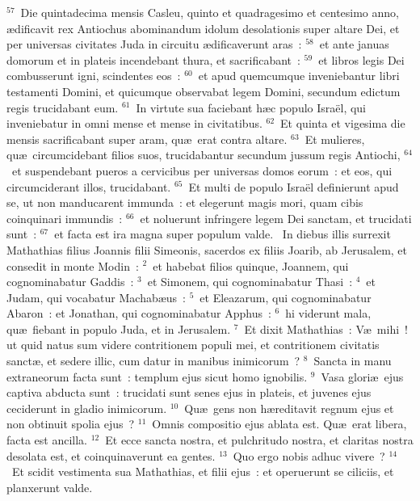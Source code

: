 ${}^{57}$~Die quintadecima mensis Casleu, quinto et quadragesimo et centesimo anno, \ae dificavit rex Antiochus abominandum idolum desolationis super altare Dei, et per universas civitates Juda in circuitu \ae dificaverunt aras~:
${}^{58}$~et ante januas domorum et in plateis incendebant thura, et sacrificabant~:
${}^{59}$~et libros legis Dei combusserunt igni, scindentes eos~:
${}^{60}$~et apud quemcumque inveniebantur libri testamenti Domini, et quicumque observabat legem Domini, secundum edictum regis trucidabant eum.
${}^{61}$~In virtute sua faciebant h\ae c populo Isra\"el, qui inveniebatur in omni mense et mense in civitatibus.
${}^{62}$~Et quinta et vigesima die mensis sacrificabant super aram, qu\ae\ erat contra altare.
${}^{63}$~Et mulieres, qu\ae\ circumcidebant filios suos, trucidabantur secundum jussum regis Antiochi,
${}^{64}$~et suspendebant pueros a cervicibus per universas domos eorum~: et eos, qui circumciderant illos, trucidabant.
${}^{65}$~Et multi de populo Isra\"el definierunt apud se, ut non manducarent immunda~: et elegerunt magis mori, quam cibis coinquinari immundis~:
${}^{66}$~et noluerunt infringere legem Dei sanctam, et trucidati sunt~:
${}^{67}$~et facta est ira magna super populum valde.
~In diebus illis surrexit Mathathias filius Joannis filii Simeonis, sacerdos ex filiis Joarib, ab Jerusalem, et consedit in monte Modin~:
${}^{2}$~et habebat filios quinque, Joannem, qui cognominabatur Gaddis~:
${}^{3}$~et Simonem, qui cognominabatur Thasi~:
${}^{4}$~et Judam, qui vocabatur Machab\ae us~:
${}^{5}$~et Eleazarum, qui cognominabatur Abaron~: et Jonathan, qui cognominabatur Apphus~:
${}^{6}$~hi viderunt mala, qu\ae\ fiebant in populo Juda, et in Jerusalem.
${}^{7}$~Et dixit Mathathias~: V\ae\ mihi~! ut quid natus sum videre contritionem populi mei, et contritionem civitatis sanct\ae , et sedere illic, cum datur in manibus inimicorum~?
${}^{8}$~Sancta in manu extraneorum facta sunt~: templum ejus sicut homo ignobilis.
${}^{9}$~Vasa glori\ae\ ejus captiva abducta sunt~: trucidati sunt senes ejus in plateis, et juvenes ejus ceciderunt in gladio inimicorum.
${}^{10}$~Qu\ae\ gens non h\ae reditavit regnum ejus et non obtinuit spolia ejus~?
${}^{11}$~Omnis compositio ejus ablata est. Qu\ae\ erat libera, facta est ancilla.
${}^{12}$~Et ecce sancta nostra, et pulchritudo nostra, et claritas nostra desolata est, et coinquinaverunt ea gentes.
${}^{13}$~Quo ergo nobis adhuc vivere~?
${}^{14}$~Et scidit vestimenta sua Mathathias, et filii ejus~: et operuerunt se ciliciis, et planxerunt valde.



